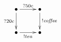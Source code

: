 $\xymatrix{
    \bullet \ar[r]^{?50c} \ar[d]_{?20c} & \bullet \ar[d]^{\mathit{!coffee}} \\
    \bullet \ar[r]_{!tea}       & \bullet }$
